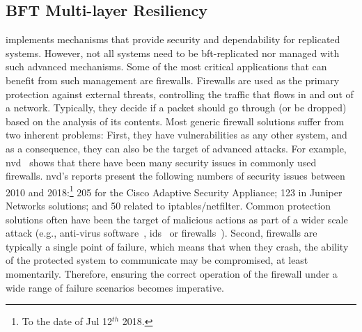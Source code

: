 \subsection{BFT Multi-layer Resiliency} 
\system implements mechanisms that provide security and dependability for replicated systems.
However, not all systems need to be \gls{bft}-replicated nor managed with such advanced mechanisms. 
Some of the most critical applications that can benefit from such management are firewalls.
Firewalls are used as the primary protection against external threats, controlling the traffic that flows in and out of a network. 
Typically, they decide if a packet should go through (or be dropped) based on the analysis of its contents. 
Most generic firewall solutions suffer from two inherent problems: 
First, they have vulnerabilities as any other system, and as a consequence, they can also be the target of advanced attacks. 
For example, \gls{nvd}~\cite{nvd} shows that there have been many security issues in commonly used firewalls. 
\gls{nvd}'s reports present the following numbers of security issues between 2010 and 2018:\footnote{To the date of Jul 12$^{th}$ 2018.} 205 for the Cisco Adaptive Security Appliance; 123 in Juniper Networks solutions; and 50 related to iptables/netfilter. 
Common protection solutions often have been the target of malicious actions as part of a wider scale attack (e.g., anti-virus software~\cite{Chauhan:2011}, \gls{ids}~\cite{Anderson:2001} or firewalls~\cite{Kamara:2003,Surisetty:2010,cisco1,cisco2}).
Second, firewalls are typically a single point of failure, which means that when they crash, the ability of the protected system to communicate may be compromised, at least momentarily.
Therefore, ensuring the correct operation of the firewall under a wide range of failure scenarios becomes imperative.


